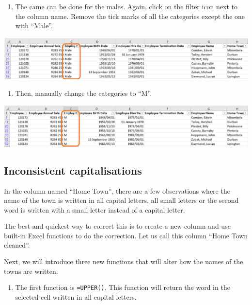 \documentclass[
]{book}
\providecommand{\tightlist}{%
  \setlength{\itemsep}{0pt}\setlength{\parskip}{0pt}}
\begin{document}
\begin{enumerate}
\def\labelenumi{\arabic{enumi}.}
\setcounter{enumi}{4}
\tightlist
\item
  The came can be done for the males. Again, click on the filter icon next to the column name. Remove the tick marks of all the categories except the one with ``Male''.
\end{enumerate}

\begin{center}\includegraphics[width=0.7\linewidth]{Figures/cleaning_categories_5} \end{center}

\begin{enumerate}
\def\labelenumi{\arabic{enumi}.}
\setcounter{enumi}{5}
\tightlist
\item
  Then, manually change the categories to ``M''.
\end{enumerate}

\begin{center}\includegraphics[width=0.7\linewidth]{Figures/cleaning_categories_6} \end{center}

\subsection*{Inconsistent capitalisations}\label{inconsistent-capitalisations}

In the column named ``Home Town'', there are a few observations where the name of the town is written in all capital letters, all small letters or the second word is written with a small letter instead of a capital letter.

The best and quickest way to correct this is to create a new column and use built-in Excel functions to do the correction. Let us call this column ``Home Town cleaned''.

Next, we will introduce three new functions that will alter how the names of the towns are written.

\begin{enumerate}
\def\labelenumi{\arabic{enumi}.}
\tightlist
\item
  The first function is \texttt{=UPPER()}. This function will return the word in the selected cell written in all capital letters.
\end{enumerate}
\end{document}
